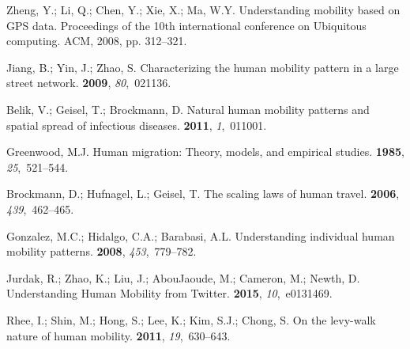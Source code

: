 \documentclass[ijgi,article,accept,moreauthors,pdftex,10pt,a4paper]{mdpi}
\theoremstyle{mdpi}
\newcounter{ex}
\newcounter{re}
\theoremstyle{mdpidefinition}
\begin{document}
\renewcommand\bibname{References}
\begin{thebibliography}{-------}
\providecommand{\natexlab}[1]{#1}

Zheng, Y.; Li, Q.; Chen, Y.; Xie, X.; Ma, W.Y.
\newblock Understanding mobility based on GPS data.
\newblock  Proceedings of the 10th international conference on Ubiquitous
  computing. ACM,  2008, pp. 312--321.

Jiang, B.; Yin, J.; Zhao, S.
\newblock Characterizing the human mobility pattern in a large street network.
 {\bf 2009}, {\em 80},~021136.

Belik, V.; Geisel, T.; Brockmann, D.
\newblock Natural human mobility patterns and spatial spread of infectious
  diseases.
 {\bf 2011}, {\em 1},~011001.

Greenwood, M.J.
\newblock Human migration: Theory, models, and empirical studies.
 {\bf 1985}, {\em 25},~521--544.

Brockmann, D.; Hufnagel, L.; Geisel, T.
\newblock The scaling laws of human travel.
 {\bf 2006}, {\em 439},~462--465.

Gonzalez, M.C.; Hidalgo, C.A.; Barabasi, A.L.
\newblock Understanding individual human mobility patterns.
 {\bf 2008}, {\em 453},~779--782.

Jurdak, R.; Zhao, K.; Liu, J.; AbouJaoude, M.; Cameron, M.; Newth, D.
\newblock Understanding Human Mobility from Twitter.
 {\bf 2015}, {\em 10},~e0131469.

Rhee, I.; Shin, M.; Hong, S.; Lee, K.; Kim, S.J.; Chong, S.
\newblock On the levy-walk nature of human mobility.
 {\bf 2011}, {\em
  19},~630--643.


\end{thebibliography}
\end{document}
